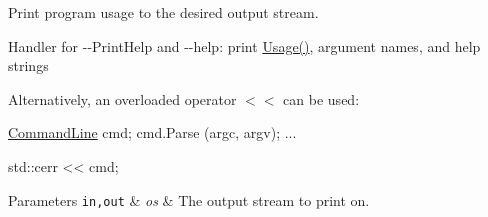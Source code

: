 Print program usage to the desired output stream. 

Handler for {\ttfamily -\/-\/Print\+Help} and {\ttfamily -\/-\/help\+:} print \hyperlink{classns3_1_1CommandLine_a9db9facadd99f6dfe78e39e22d5db3c0}{Usage()}, argument names, and help strings

Alternatively, an overloaded operator $<$$<$ can be used\+: 
\begin{DoxyCode}
  \hyperlink{classns3_1_1CommandLine_ae72c68fdc19bb9a8b20d7a3e17c9c7b0}{CommandLine} cmd;
  cmd.Parse (argc, argv);
...

  std::cerr << cmd;
\end{DoxyCode}



\begin{DoxyParams}[1]{Parameters}
\mbox{\tt in,out}  & {\em os} & The output stream to print on. \\
\hline
\end{DoxyParams}

